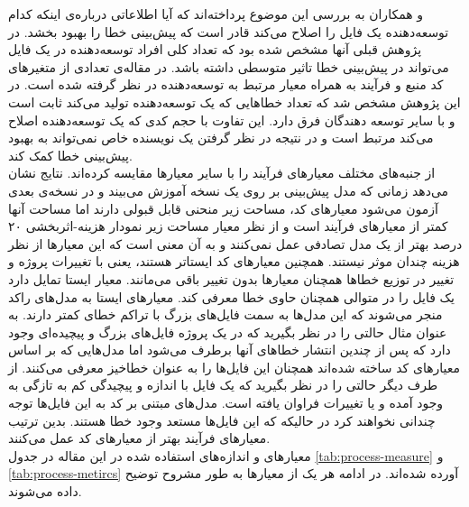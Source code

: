  و همکاران به بررسی این موضوع پرداخته‌اند که آیا اطلاعاتی درباره‌ی اینکه کدام توسعه‌دهنده یک فایل را اصلاح می‌کند قادر است که پیش‌بینی خطا را بهبود بخشد. در پژوهش قبلی آنها\cite{weyuker2008too} مشخص شده بود که تعداد کلی   افراد توسعه‌دهنده در یک فایل می‌تواند در پیش‌بینی خطا تاثیر متوسطی داشته باشد. در  مقاله‌ی \cite{ostrand2010programmer}  تعدادی از متغیرهای کد منبع و فرآیند به همراه معیار مرتبط به توسعه‌دهنده در نظر گرفته شده است.  در این پژوهش مشخص شد  که تعداد خطاهایی که یک توسعه‌دهنده تولید می‌کند ثابت است و با سایر توسعه دهندگان فرق دارد. این تفاوت با  حجم کدی که یک توسعه‌دهنده اصلاح می‌کند مرتبط است و در نتیجه در نظر گرفتن یک نویسنده خاص نمی‌تواند به بهبود پیش‌بینی خطا کمک کند\cite{ostrand2010programmer}. \\

 از جنبه‌های مختلف معیارهای فرآیند  را با سایر معیارها مقایسه کرده‌اند\cite{rahman2013and}. نتایج نشان می‌دهد  زمانی که مدل پیش‌بینی بر روی یک نسخه آموزش می‌بیند و در نسخه‌ی بعدی آزمون می‌شود معیارهای کد، مساحت زیر منحنی  قابل قبولی دارند اما مساحت آنها کمتر از معیارهای فرآیند است  و از نظر معیار مساحت زیر نمودار هزینه-اثربخشی ۲۰ درصد 
بهتر از یک مدل تصادفی عمل نمی‌کنند و  به آن معنی است که این معیارها از نظر هزینه چندان  موثر نیستند. همچنین معیارهای کد ایستاتر هستند، ‌یعنی با تغییرات پروژه و تغییر در توزیع خطاها همچنان معیارها بدون تغییر باقی می‌مانند. معیار ایستا تمایل دارد یک فایل را در  متوالی همچنان حاوی خطا معرفی کند. معیارهای ایستا به مدل‌های راکد منجر می‌شوند که این مدل‌ها به سمت فایل‌های بزرگ با تراکم خطای کمتر  دارند. به عنوان مثال حالتی را در نظر بگیرید که در یک پروژه فایل‌های بزرگ و پیچیده‌ای وجود دارد که پس از چندین انتشار خطاهای آنها برطرف می‌شود اما مدل‌هایی که بر اساس معیارهای کد ساخته شده‌اند همچنان این فایل‌ها را به عنوان خطا‌خیز معرفی می‌کنند. از طرف دیگر حالتی را در نظر بگیرید که یک فایل با اندازه و پیچیدگی کم به تازگی به وجود آمده و یا تغییرات فراوان یافته است. مدل‌های مبتنی بر کد به این فایل‌ها توجه چندانی نخواهند کرد در حالیکه که این فایل‌ها مستعد وجود خطا هستند. بدین ترتیب معیارهای فرآیند بهتر از معیارهای کد عمل می‌کنند. \\
معیارهای و اندازه‌های استفاده شده در این مقاله در جدول \ref{tab:process-measure} و \ref{tab:process-metircs} آورده شده‌اند. در ادامه هر یک از معیارها به طور مشروح توضیح داده می‌شوند. 
 
